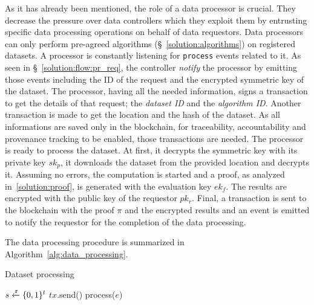 As it has already been mentioned, the role of a data processor is crucial. They decrease the pressure over data controllers which they exploit them by entrusting specific data processing operations on behalf of data requestors. Data processors can only perform pre-agreed algorithms (§~\ref{solution:algorithms}) on registered datasets. A processor is constantly listening for \verb|process| events related to it. As seen in §~\ref{solution:flow:pr_req}, the controller \textit{notify} the processor by emitting those events including the ID of the request and the encrypted symmetric key of the dataset. The processor, having all the needed information, signs a transaction to get the details of that request; the \textit{dataset ID} and the \textit{algorithm ID}. Another transaction is made to get the location and the hash of the dataset. As all informations are saved only in the blockchain, for traceability, accountability and provenance tracking to be enabled, those transactions are needed. The processor is ready to process the dataset. At first, it decrypts the symmetric key with its private key $sk_p$, it downloads the dataset from the provided location and decrypts it. Assuming no errors, the computation is started and a proof, as analyzed in~\ref{solution:proof}, is generated with the evaluation key $ek_f$. The results are encrypted with the public key of the requestor $pk_r$. Final, a transaction is sent to the blockchain with the proof $\pi$ and the encrypted results and an event is emitted to notify the requestor for the completion of the data processing.

The data processing procedure is summarized in Algorithm~\ref{alg:data_processing}.

\begin{algorithm}[!htb]
  \caption{Dataset processing}\label{alg:data_processing}
  \begin{algorithmic}[1]
     
     
     
     
     
    \State $s \xleftarrow{\mathtt{r}}{\{0, 1\}^{l}}$ 
     
     
     
     
    \State $tx$.send()
  \EndProcedure
     
      \State process($e$) 
    \EndWhile
  \EndProcedure
  \end{algorithmic}
\end{algorithm}

